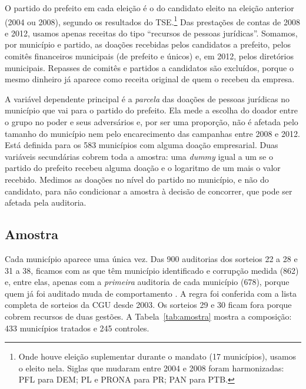 O partido do prefeito em cada eleição é o do candidato eleito na eleição anterior (2004 ou 2008), segundo
os resultados do TSE.\footnote{Onde houve eleição suplementar durante o mandato (17 municípios), usamos o
eleito nela. Siglas que mudaram entre 2004 e 2008 foram harmonizadas: PFL para DEM; PL e PRONA para PR;
PAN para PTB.} Das prestações de contas de 2008 e 2012, usamos apenas receitas do tipo ``recursos de pessoas
jurídicas''. Somamos, por município e partido, as doações recebidas pelos candidatos a prefeito, pelos
comitês financeiros municipais (de prefeito e únicos) e, em 2012, pelos diretórios municipais. Repasses de
comitês e partidos a candidatos são excluídos, porque o mesmo dinheiro já aparece como receita original de
quem o recebeu da empresa.

A variável dependente principal é a \textit{parcela} das doações de pessoas jurídicas no município que vai
para o partido do prefeito. Ela mede a escolha do doador entre o grupo no poder e seus adversários e, por
ser uma proporção, não é afetada pelo tamanho do município nem pelo encarecimento das campanhas entre 2008
e 2012. Está definida para os 583 municípios com alguma doação empresarial. Duas variáveis secundárias
cobrem toda a amostra: uma \textit{dummy} igual a um se o partido do prefeito recebeu alguma doação e o
logaritmo de um mais o valor recebido. Medimos as doações no nível do partido no município, e não do
candidato, para não condicionar a amostra à decisão de concorrer, que pode ser afetada pela auditoria.

\FloatBarrier
\subsection{Amostra}

Cada município aparece uma única vez. Das 900 auditorias dos sorteios 22 a 28 e 31 a 38, ficamos com as
que têm município identificado e corrupção medida (862) e, entre elas, apenas com a \textit{primeira}
auditoria de cada município (678), porque quem já foi auditado muda de comportamento \cite{avis2018}. A
regra foi conferida com a lista completa de sorteios da CGU desde 2003. Os sorteios 29 e 30 ficam fora
porque cobrem recursos de duas gestões. A Tabela~\ref{tab:amostra} mostra a composição: 433 municípios
tratados e 245 controles.

\begin{table}[!htb]
\centering
\caption{Sorteios, datas de divulgação e amostra}\label{tab:amostra}
\footnotesize

\end{table}


